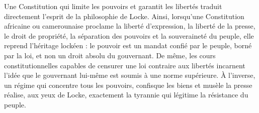 \documentclass[11pt]{article}
\begin{document}
\begin{exemplebox}
Une Constitution qui limite les pouvoirs et garantit les libertés traduit directement l'esprit de la philosophie de Locke. Ainsi, lorsqu'une Constitution africaine ou camerounaise proclame la liberté d'expression, la liberté de la presse, le droit de propriété, la séparation des pouvoirs et la souveraineté du peuple, elle reprend l'héritage lockéen : le pouvoir est un mandat confié par le peuple, borné par la loi, et non un droit absolu du gouvernant. De même, les cours constitutionnelles capables de censurer une loi contraire aux libertés incarnent l'idée que le gouvernant lui-même est soumis à une norme supérieure. À l'inverse, un régime qui concentre tous les pouvoirs, confisque les biens et musèle la presse réalise, aux yeux de Locke, exactement la tyrannie qui légitime la résistance du peuple.
\end{exemplebox}
\end{document}
